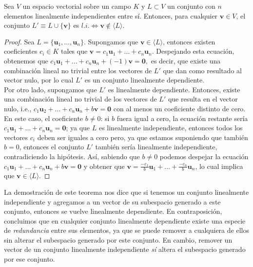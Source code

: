 \documentclass[notasLineal]{subfiles}
\begin{document}
\begin{Teo}\label{teo: Agregar un elemento que no está en un subespacio generado a un conjunto generador linealmente independiente equivale a que el conjunto siga siendo linealmente independiente}

Sea $V$ un espacio vectorial sobre un campo $K$ y $L\subset V$ un conjunto con $n$ elementos linealmente independientes entre sí. Entonces, para cualquier $\mathbf{v}\in V$, el conjunto $L'\equiv L\cup \{\mathbf{v}\}$ es $l.i. \iff \mathbf{v}\notin \langle L \rangle$.

\begin{proof}
Sea $L=\{\mathbf{u}_1, ... , \mathbf{u}_n\}.$ Supongamos que $\mathbf{v}\in\langle L \rangle$, entonces existen coeficientes $c_i\in K$ tales que $\mathbf{v}=c_1\mathbf{u}_1+...+c_n\mathbf{u}_n.$ Despejando esta ecuación, obtenemos que $c_1\mathbf{u}_1+...+c_n\mathbf{u}_n+(-1)\mathbf{v}=\mathbf{0},$ es decir, que existe una combinación lineal no trivial entre los vectores de $L'$ que dan como resultado al vector nulo, por lo cual $L'$ es un conjunto linealmente dependiente. \\

Por otro lado, supongamos que $L'$ es linealmente dependiente. Entonces, existe una combinación lineal no trivial de los vectores de $L'$ que resulta en el vector nulo, i.e., $c_1\mathbf{u}_2+...+c_n\mathbf{u}_n+b\mathbf{v}=\mathbf{0}$ con al menos un coeficiente distinto de cero. En este caso, el coeficiente $b\neq 0$: si $b$ fuera igual a cero, la ecuación restante sería $c_1\mathbf{u}_1+...+c_n\mathbf{u}_n=\mathbf{0}$; ya que $L$ es linealmente independiente, entonces todos los vectores $c_i$ deben ser iguales a cero pero, ya que estamos suponiendo que también $b=0$, entonces el conjunto $L'$ también sería linealmente independiente, contradiciendo la hipótesis. Así, sabiendo que $b\neq 0$ podemos despejar la ecuación $c_1\mathbf{u}_1+...+c_n\mathbf{u}_n+b\mathbf{v}=\mathbf{0}$ y obtener que $\mathbf{v}=\frac{-c_1}{b}\mathbf{u}_1+...+\frac{-c_n}{b}\mathbf{u}_n$, lo cual implica que $\mathbf{v}\in\langle L \rangle.$

\end{proof}

    La demostración de este teorema nos dice que si tenemos un conjunto linealmente independiente y agregamos a un vector de su subespacio generado a este conjunto, entonces se vuelve linealmente dependiente. En contraposición, concluimos que en cualquier conjunto linealmente dependiente existe una especie de \emph{redundancia} entre sus elementos, ya que se puede remover a cualquiera de ellos sin alterar el subespacio generado por este conjunto. En cambio, remover un vector de un conjunto linealmente independiente \emph{sí} altera el subespacio generado por ese conjunto.
\end{Teo}
\end{document}
